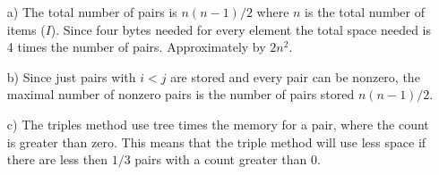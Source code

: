 \documentclass[11pt,a4paper]{scrartcl}
\begin{document}
\begin{itemize}

\item[a)] The total number of pairs is $n(n-1)/2$ where $n$ is the total number of items ($I$). Since four bytes needed for every element the total space needed is 4 times the number of pairs. Approximately by $2n^2$.
\item[b)] Since just pairs with $i < j$ are stored and every pair can be nonzero, the maximal number of nonzero pairs is the number of pairs stored $n(n-1)/2$.
\item[c)] The triples method use tree times the memory for a pair, where the count is greater than zero. This means that the triple method will use less space if there are less then $1 / 3$ pairs with a count greater than $0$.

\end{itemize}
\end{document}
